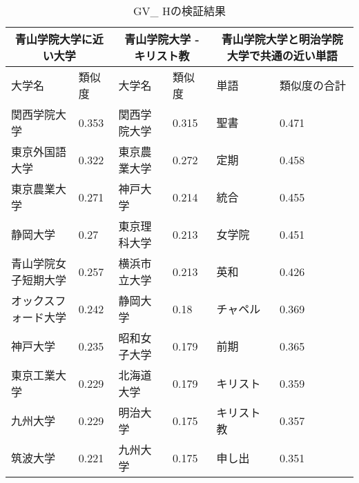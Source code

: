 \begin{table}[H]
\caption{GV\_ Hの検証結果}
\centering
\footnotesize
\begin{tabular}{ll|ll|ll}
\hline
\multicolumn{2}{c}{青山学院大学に近い大学} & \multicolumn{2}{c}{青山学院大学 - キリスト教} & \multicolumn{2}{c}{青山学院大学と明治学院大学で共通の近い単語}
\\ \hline
大学名 & 類似度 & 大学名 & 類似度 & 単語 & 類似度の合計
\\ \hline \hline
関西学院大学 & 0.353 & 関西学院大学 & 0.315 & 聖書 & 0.471\\
東京外国語大学 & 0.322 & 東京農業大学 & 0.272 & 定期 & 0.458\\
東京農業大学 & 0.271 & 神戸大学 & 0.214 & 統合 & 0.455\\
静岡大学 & 0.27 & 東京理科大学 & 0.213 & 女学院 & 0.451\\
青山学院女子短期大学 & 0.257 & 横浜市立大学 & 0.213 & 英和 & 0.426\\
オックスフォード大学 & 0.242 & 静岡大学 & 0.18 & チャペル & 0.369\\
神戸大学 & 0.235 & 昭和女子大学 & 0.179 & 前期 & 0.365\\
東京工業大学 & 0.229 & 北海道大学 & 0.179 & キリスト & 0.359\\
九州大学 & 0.229 & 明治大学 & 0.175 & キリスト教 & 0.357\\
筑波大学 & 0.221 & 九州大学 & 0.175 & 申し出 & 0.351\\ \hline
\end{tabular}
\label{table:gvh}
\end{table}

